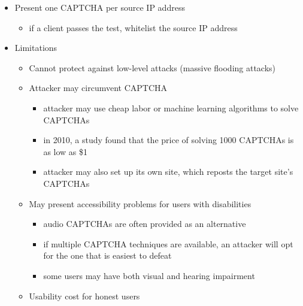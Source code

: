\documentclass[final]{article}
\begin{document}
\begin{itemize}
\begin{itemize}[nosep]
              \item Present one CAPTCHA per source IP address
                    \begin{itemize}[nosep]
                        \item if a client passes the test, whitelist the source IP address
                    \end{itemize}
              \item Limitations
                    \begin{itemize}[nosep]
                        \item Cannot protect against low-level attacks (massive flooding attacks)
                        \item Attacker may circumvent CAPTCHA
                              \begin{itemize}[nosep]
                                  \item attacker may use cheap labor or machine learning algorithms to solve CAPTCHAs
                                  \item in 2010, a study found that the price of solving 1000 CAPTCHAs is as low as \$1
                                  \item attacker may also set up its own site, which reposts the target site’s CAPTCHAs
                              \end{itemize}
                        \item May present accessibility problems for users with disabilities
                              \begin{itemize}[nosep]
                                  \item audio CAPTCHAs are often provided as an alternative
                                  \item if multiple CAPTCHA techniques are available, an attacker will opt for the one that is easiest to defeat
                                  \item some users may have both visual and hearing impairment
                              \end{itemize}
                        \item Usability cost for honest users
                    \end{itemize}
          \end{itemize}
\end{itemize}
\end{document}
